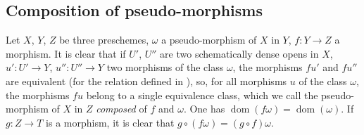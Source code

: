 \subsection{Composition of pseudo-morphisms}
\label{IV.20.3}

\begin{env}[20.3.1]
\label{IV.20.3.1}
Let $X$, $Y$, $Z$ be three preschemes, $\omega$ a pseudo-morphism of $X$ in $Y$, $f:Y\to Z$ a morphism.
It is clear that if $U'$, $U''$ are two schematically dense opens in $X$, $u':U'\to Y$, $u'':U''\to Y$ two morphisms of the class $\omega$, the morphisms $fu'$ and $fu''$ are equivalent (for the relation defined in ), so, for all morphisms $u$ of the class $\omega$, the morphisms $fu$ belong to a single equivalence class, which we call the pseudo-morphism of $X$ in $Z$ \emph{composed} of $f$ and $\omega$.
One has $\operatorname{dom}(f\omega)=\operatorname{dom}(\omega)$.
If $g:Z\to T$ is a morphism, it is clear that $g\circ(f\omega)=(g\circ f)\omega$.
\end{env}

